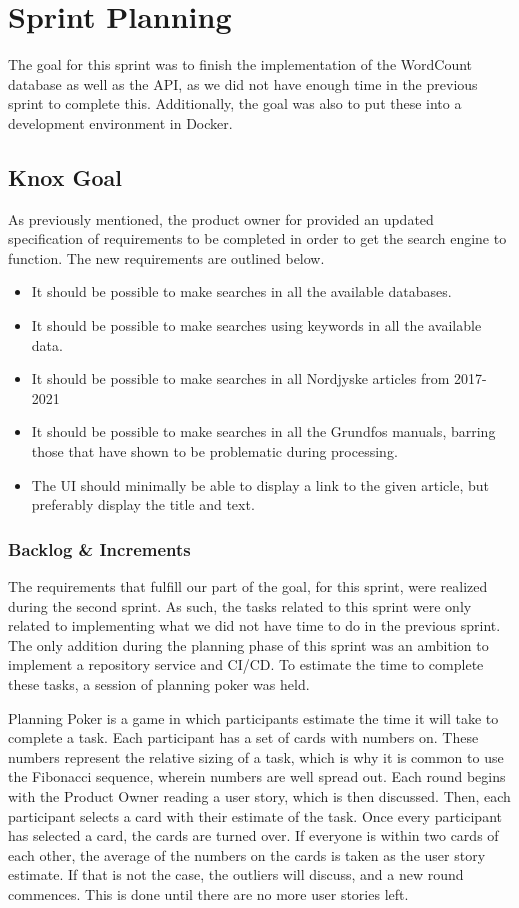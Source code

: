 \section{Sprint Planning}\label{sec:sprintPlanningSprint3}
The goal for this sprint was to finish the implementation of the WordCount database as well as the API, as we did not have enough time in the previous sprint to complete this. Additionally, the goal was also to put these into a development environment in Docker.

\subsection{Knox Goal}\label{ssec:sprint3Goal}
As previously mentioned, the product owner for \knox{} provided an updated specification of requirements to be completed in order to get the search engine to function. The new requirements are outlined below. 
\begin{itemize}
	\item It should be possible to make searches in all the available databases.
	\item It should be possible to make searches using keywords in all the available data.
	\item It should be possible to make searches in all Nordjyske articles from 2017-2021
	\item It should be possible to make searches in all the Grundfos manuals, barring those that have shown to be problematic during processing.
	\item The UI should minimally be able to display a link to the given article, but preferably display the title and text.
\end{itemize}


\subsubsection{Backlog \& Increments}
The requirements that fulfill our part of the \knox{} goal, for this sprint, were realized during the second sprint. As such, the tasks related to this sprint were only related to implementing what we did not have time to do in the previous sprint. 
The only addition during the planning phase of this sprint was an ambition to implement a repository service and CI/CD. To estimate the time to complete these tasks, a session of planning poker was held. 

Planning Poker is a game in which participants estimate the time it will take to complete a task. Each participant has a set of cards with numbers on. These numbers represent the relative sizing of a task, which is why it is common to use the Fibonacci sequence, wherein numbers are well spread out.
Each round begins with the Product Owner reading a user story, which is then discussed. Then, each participant selects a card with their estimate of the task. Once every participant has selected a card, the cards are turned over. If everyone is within two cards of each other, the average of the numbers on the cards is taken as the user story estimate. If that is not the case, the outliers will discuss, and a new round commences.
This is done until there are no more user stories left\cite{sutherlandScrumArtDoing2014}.


